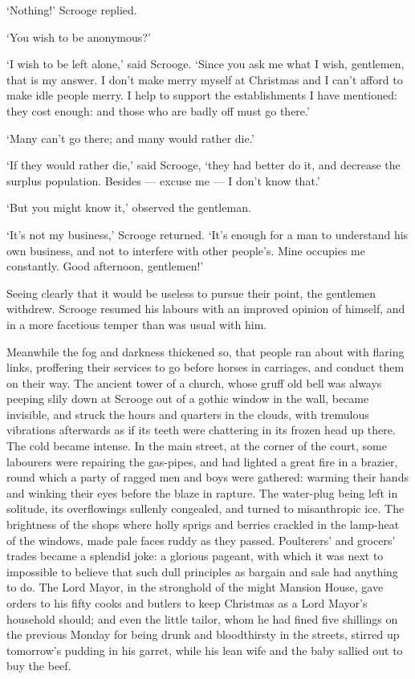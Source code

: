 \documentclass[11pt,twoside]{article}\makeatletter
\begin{document}
‘Nothing!’ Scrooge replied.  \par
           ‘You wish to be anonymous?’         \par
‘I wish to be left alone,’ said Scrooge.  ‘Since  you ask me what I wish, gentlemen, that is my answer.  I don't make merry myself at Christmas and I can't afford to make idle people merry.  I help to support the establishments I have mentioned: they cost enough: and those who are badly off must go there.’  \par
           ‘Many can't go there; and many would rather die.’         \par
‘If they would rather die,’ said Scrooge, ‘they had better do it, and decrease the surplus population.  Besides — excuse me — I don't know that.’  \par
‘But you might know it,’ observed the gentleman.  \par
‘It's not my business,’ Scrooge returned.  ‘It's enough for a man to understand his own business, and not to interfere with other people's.  Mine occupies me constantly. Good afternoon, gentlemen!’  \par
Seeing clearly that it would be useless to pursue their point, the gentlemen withdrew.  Scrooge resumed his labours with an improved opinion of himself, and in a more facetious temper than was usual with him.   \par
Meanwhile the fog and darkness thickened so, that people ran about with flaring links, proffering their services to go before horses in carriages, and conduct them on their way. The ancient tower of a church, whose gruff old bell was always peeping slily down at Scrooge out of a gothic window in the wall, became invisible, and struck the hours and quarters in the clouds, with tremulous vibrations afterwards as if its teeth were chattering in its frozen head up there. The cold became intense.  In the main street, at the corner of the court, some labourers were repairing the gas-pipes, and had lighted a great fire in a brazier, round which a party of ragged men and boys were gathered: warming their hands and winking their eyes before the blaze in rapture. The water-plug being left in solitude, its overflowings sullenly congealed, and turned to misanthropic ice.  The brightness of the shops where holly sprigs and berries crackled in the lamp-heat of the windows, made pale faces ruddy as they passed.  Poulterers' and grocers' trades became a splendid joke: a glorious pageant, with which it was next to impossible to believe that such dull principles as bargain and sale had anything to do.  The Lord Mayor, in the stronghold of the might Mansion House, gave orders to his fifty cooks and butlers to keep Christmas as a Lord Mayor's household should; and even the little tailor, whom he had fined five shillings on the previous Monday for being drunk and bloodthirsty in the streets, stirred up tomorrow's pudding in his garret, while his lean wife and the baby sallied out to buy the beef.  \par
\end{document}
